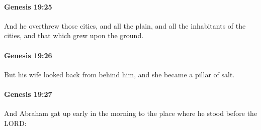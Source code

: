 		\paragraph{Genesis 19:25} %
			\label{GENESIS-19-25}

			And he overthrew those cities, and all the plain, and all the inhabitants of the cities, and that which grew upon the ground.


		\paragraph{Genesis 19:26} %
			\label{GENESIS-19-26}

			But his wife looked back from behind him, and she became a pillar of salt.


		\paragraph{Genesis 19:27} %
			\label{GENESIS-19-27}

			And Abraham gat up early in the morning to the place where he stood before the LORD:


